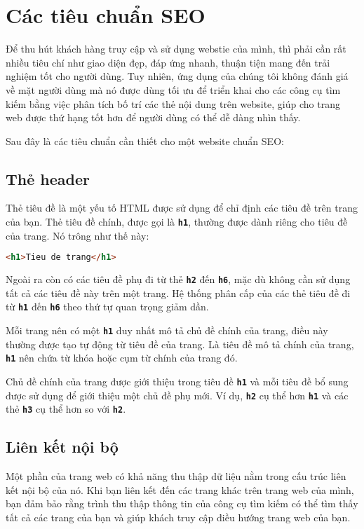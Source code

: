 \chapter{Các tiêu chuẩn SEO}
Để thu hút khách hàng truy cập và sử dụng webstie của mình, thì phải cần rất nhiều tiêu chí như giao diện đẹp, đáp ứng nhanh, thuận tiện mang đến trải nghiệm tốt cho người dùng. Tuy nhiên, ứng dụng của chúng tôi không đánh giá về mặt người dùng mà nó được dùng tối ưu để triển khai cho các công cụ tìm kiếm bằng việc phân tích bố trí các thẻ nội dung trên website, giúp cho trang web được thứ hạng tốt hơn để người dùng có thể dễ dàng nhìn thấy.
\par
Sau đây là các tiêu chuẩn cần thiết cho một website chuẩn SEO\cite{seo}:
\section{Thẻ header}
Thẻ tiêu đề là một yếu tố HTML được sử dụng để chỉ định các tiêu đề trên trang của bạn. Thẻ tiêu đề chính, được gọi là \textbf{\texttt{h1}}, thường được dành riêng cho tiêu đề của trang. Nó trông như thế này:
\begin{lstlisting}[language=html]
<h1>Tieu de trang</h1>
\end{lstlisting}
\par
Ngoài ra còn có các tiêu đề phụ đi từ thẻ \textbf{\texttt{h2}} đến \textbf{\texttt{h6}}, mặc dù không cần sử dụng tất cả các tiêu đề này trên một trang. Hệ thống phân cấp của các thẻ tiêu đề đi từ \textbf{\texttt{h1}} đến \textbf{\texttt{h6}} theo thứ tự quan trọng giảm dần.
\par
Mỗi trang nên có một \textbf{\texttt{h1}} duy nhất mô tả chủ đề chính của trang, điều này thường được tạo tự động từ tiêu đề của trang. Là tiêu đề mô tả chính của trang, \textbf{\texttt{h1}} nên chứa từ khóa hoặc cụm từ chính của trang đó.
\par
Chủ đề chính của trang được giới thiệu trong tiêu đề \textbf{\texttt{h1}} và mỗi tiêu đề bổ sung được sử dụng để giới thiệu một chủ đề phụ mới. Ví dụ, \textbf{\texttt{h2}} cụ thể hơn \textbf{\texttt{h1}} và các thẻ \textbf{\texttt{h3}} cụ thể hơn so với \textbf{\texttt{h2}}.
\section{Liên kết nội bộ}
Một phần của trang web có khả năng thu thập dữ liệu nằm trong cấu trúc liên kết nội bộ của nó. Khi bạn liên kết đến các trang khác trên trang web của mình, bạn đảm bảo rằng trình thu thập thông tin của công cụ tìm kiếm có thể tìm thấy tất cả các trang của bạn và giúp khách truy cập điều hướng trang web của bạn.
